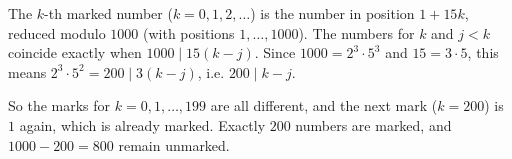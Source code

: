 The $k$-th marked number ($k=0,1,2,\dots$) is the number in position $1+15k$, reduced modulo $1000$ (with positions $1,\dots,1000$). The numbers for $k$ and $j<k$ coincide exactly when $1000\mid15(k-j)$. Since $1000=2^3\cdot5^3$ and $15=3\cdot5$, this means $2^3\cdot5^2=200\mid3(k-j)$, i.e. $200\mid k-j$.

So the marks for $k=0,1,\dots,199$ are all different, and the next mark ($k=200$) is $1$ again, which is already marked. Exactly $200$ numbers are marked, and $1000-200=\boxed{800}$ remain unmarked.
